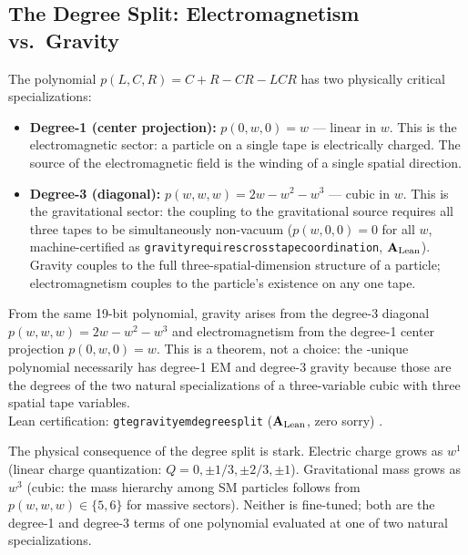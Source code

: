\documentclass[11pt,openany]{book}
\theoremstyle{remark}
\newcommand{\MDL}{\text{MDL}}
\newcommand{\lean}[1]{%
  \penalty-100
  \begingroup\def\_{\textunderscore\allowbreak}\texttt{#1}\endgroup}
\newcommand{\CatAL}{\ensuremath{\textbf{A}_{\rm Lean}}}
\begin{document}
\subsection*{The Degree Split: Electromagnetism vs.\ Gravity}

The polynomial $p(L,C,R) = C + R - CR - LCR$ has two physically critical specializations:

\begin{itemize}
\item \textbf{Degree-1 (center projection):} $p(0, w, 0) = w$ — linear in $w$.  This is the
  electromagnetic sector: a particle on a single tape is electrically charged.  The source
  of the electromagnetic field is the winding of a single spatial direction.

\item \textbf{Degree-3 (diagonal):} $p(w, w, w) = 2w - w^2 - w^3$ — cubic in $w$.  This is
  the gravitational sector: the coupling to the gravitational source requires all three
  tapes to be simultaneously non-vacuum ($p(w, 0, 0) = 0$ for all $w$, machine-certified
  as \lean{gravity\_requires\_cross\_tape\_coordination}, \CatAL).  Gravity couples to the
  full three-spatial-dimension structure of a particle; electromagnetism couples to the
  particle's existence on any one tape.
\end{itemize}

\begin{tcolorbox}[colback=orange!5,colframe=orange!60,title={Result: Gravity/EM Degree Split (\CatAL)}]
From the same 19-bit polynomial, gravity arises from the degree-3 diagonal
$p(w,w,w) = 2w - w^2 - w^3$ and electromagnetism from the degree-1 center projection
$p(0,w,0) = w$.  This is a theorem, not a choice: the \MDL-unique polynomial necessarily
has degree-1 EM and degree-3 gravity because those are the degrees of the two natural
specializations of a three-variable cubic with three spatial tape variables.\\[4pt]
Lean certification: \lean{gte\_gravity\_em\_degree\_split} (\CatAL, zero sorry)
\cite{SpivackGTEPolynomialUFT}.
\end{tcolorbox}

The physical consequence of the degree split is stark.  Electric charge grows as $w^1$
(linear charge quantization: $Q = 0, \pm 1/3, \pm 2/3, \pm 1$).  Gravitational mass
grows as $w^3$ (cubic: the mass hierarchy among SM particles follows from
$p(w,w,w) \in \{5, 6\}$ for massive sectors).  Neither is fine-tuned; both are the
degree-1 and degree-3 terms of one polynomial evaluated at one of two natural
specializations.
\end{document}
